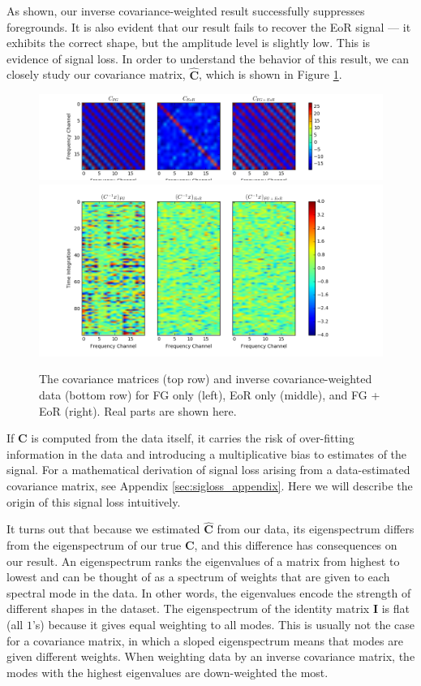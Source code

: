 \documentclass[preprint2,numberedappendix,tighten]{aastex6}  %
\begin{document}
As shown, our inverse covariance-weighted result successfully suppresses foregrounds. It is also evident that our result fails to recover the EoR signal --- it exhibits the correct shape, but the amplitude level is slightly low. This is evidence of signal loss. In order to understand the behavior of this result, we can closely study our covariance matrix, $\hat{\textbf{C}}$, which is shown in Figure \ref{fig:toy_sigloss12}.

\begin{figure}
	\centering
	\includegraphics[trim={1.5cm 0.2cm 3.5cm 0.3cm},clip,width=\columnwidth]{plots/toy_sigloss12.png}
	\includegraphics[trim={1.5cm 0.2cm 3.5cm 0.3cm},clip,width=\columnwidth]{plots/toy_sigloss13.png}
	\caption{The covariance matrices (top row) and inverse covariance-weighted data (bottom row) for FG only (left), EoR only (middle), and FG + EoR (right). Real parts are shown here.}
	\label{fig:toy_sigloss12}
\end{figure}

If $\textbf{C}$ is computed from the data itself, it carries the risk of over-fitting information in the data and introducing a multiplicative bias to estimates of the signal. For a mathematical derivation of signal loss arising from a data-estimated covariance matrix, see Appendix \ref{sec:sigloss_appendix}. Here we will describe the origin of this signal loss intuitively.

It turns out that because we estimated $\hat{\textbf{C}}$ from our data, its eigenspectrum differs from the eigenspectrum of our true $\textbf{C}$, and this difference has consequences on our result. An eigenspectrum ranks the eigenvalues of a matrix from highest to lowest and can be thought of as a spectrum of weights that are given to each spectral mode in the data. In other words, the eigenvalues encode the strength of different shapes in the dataset. The eigenspectrum of the identity matrix $\textbf{I}$ is flat (all $1$'s) because it gives equal weighting to all modes. This is usually not the case for a covariance matrix, in which a sloped eigenspectrum means that modes are given different weights. When weighting data by an inverse covariance matrix, the modes with the highest eigenvalues are down-weighted the most. 
\end{document}
